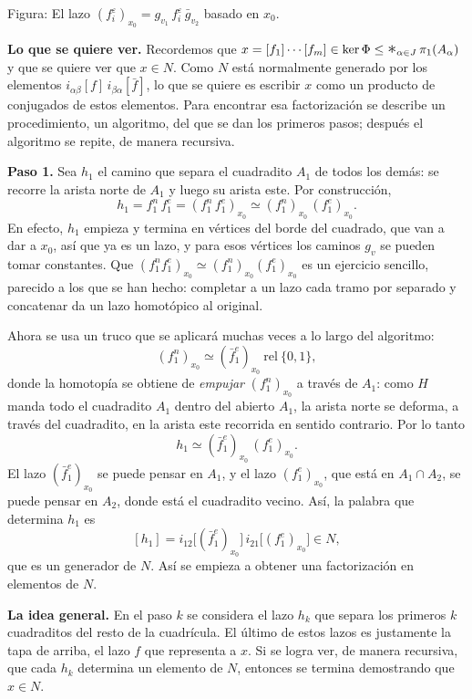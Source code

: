 \documentclass[11pt]{article}
\begin{document}
\noindent Figura: El lazo $(f_i^\varepsilon)_{x_0}=g_{v_1}\,f_i^\varepsilon\,\bar g_{v_2}$ basado en $x_0$.

\noindent\textbf{Lo que se quiere ver.} Recordemos que $x=[f_1]\cdots[f_m]\in\ker\Phi\leq \mathop{\scalebox{1.4}{$*$}}_{\alpha\in J}\pi_1(A_\alpha)$ y que se quiere ver que $x\in N$. Como $N$ está normalmente generado por los elementos $i_{\alpha\beta}[f]\,i_{\beta\alpha}[\bar f]$, lo que se quiere es escribir $x$ como un producto de conjugados de estos elementos. Para encontrar esa factorización se describe un procedimiento, un algoritmo, del que se dan los primeros pasos; después el algoritmo se repite, de manera recursiva.

\noindent\textbf{Paso 1.} Sea $h_1$ el camino que separa el cuadradito $A_1$ de todos los demás: se recorre la arista norte de $A_1$ y luego su arista este. Por construcción,
\[
  h_1=f_1^n\,f_1^e=(f_1^n\,f_1^e)_{x_0}\simeq(f_1^n)_{x_0}\,(f_1^e)_{x_0}.
\]
En efecto, $h_1$ empieza y termina en vértices del borde del cuadrado, que van a dar a $x_0$, así que ya es un lazo, y para esos vértices los caminos $g_v$ se pueden tomar constantes. Que $(f_1^nf_1^e)_{x_0}\simeq(f_1^n)_{x_0}(f_1^e)_{x_0}$ es un ejercicio sencillo, parecido a los que se han hecho: completar a un lazo cada tramo por separado y concatenar da un lazo homotópico al original.

Ahora se usa un truco que se aplicará muchas veces a lo largo del algoritmo:
\[
  (f_1^n)_{x_0}\simeq(\bar f_1^e)_{x_0}\ \mathrm{rel}\ \{0,1\},
\]
donde la homotopía se obtiene de \emph{empujar} $(f_1^n)_{x_0}$ a través de $A_1$: como $H$ manda todo el cuadradito $A_1$ dentro del abierto $A_1$, la arista norte se deforma, a través del cuadradito, en la arista este recorrida en sentido contrario. Por lo tanto
\[
  h_1\simeq(\bar f_1^e)_{x_0}\,(f_1^e)_{x_0}.
\]
El lazo $(\bar f_1^e)_{x_0}$ se puede pensar en $A_1$, y el lazo $(f_1^e)_{x_0}$, que está en $A_1\cap A_2$, se puede pensar en $A_2$, donde está el cuadradito vecino. Así, la palabra que determina $h_1$ es
\[
  [h_1]=i_{12}\bigl[(\bar f_1^e)_{x_0}\bigr]\,i_{21}\bigl[(f_1^e)_{x_0}\bigr]\in N,
\]
que es un generador de $N$. Así se empieza a obtener una factorización en elementos de $N$.

\noindent\textbf{La idea general.} En el paso $k$ se considera el lazo $h_k$ que separa los primeros $k$ cuadraditos del resto de la cuadrícula. El último de estos lazos es justamente la tapa de arriba, el lazo $f$ que representa a $x$. Si se logra ver, de manera recursiva, que cada $h_k$ determina un elemento de $N$, entonces se termina demostrando que $x\in N$.
\end{document}
